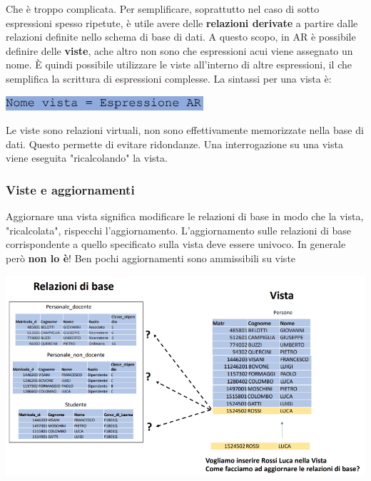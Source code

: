 \documentclass[12pt]{article}
\begin{document}
Che è troppo complicata.
Per semplificare, soprattutto nel caso di sotto espressioni spesso ripetute, è utile avere delle \textbf{relazioni derivate} a partire dalle relazioni definite nello schema di base di dati.
A questo scopo, in AR è possibile definire delle \textbf{viste}, ache altro non sono che espressioni acui viene assegnato un nome.
È quindi possibile utilizzare le viste all'interno di altre espressioni, il che semplifica la scrittura di espressioni complesse.
La sintassi per una vista è:
\begin{center}
    \includegraphics[width = 0.55\textwidth]{Images/163.PNG}
\end{center}
Le viste sono relazioni virtuali, non sono effettivamente memorizzate nella base di dati.
Questo permette di evitare ridondanze.
Una interrogazione su una vista viene eseguita "ricalcolando" la vista.
\subsubsection{Viste e aggiornamenti}
Aggiornare una vista significa modificare le relazioni di base in modo che la vista, "ricalcolata", rispecchi l'aggiornamento.
L'aggiornamento sulle relazioni di base corrispondente a quello specificato sulla vista deve essere univoco. In generale però \textbf{non lo è}!
Ben pochi aggiornamenti sono ammissibili su viste
\begin{center}
    \includegraphics[width = 1.15\textwidth]{Images/164.PNG}
\end{center}
\newpage 
\end{document}
